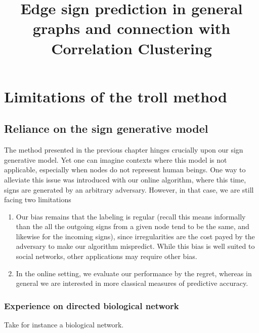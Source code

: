 \documentclass[nobib, a4paper, 10pt, oneside, onecolumn, openany, notitlepage, final,
svgnames, marginals=raggedouter, english,
]{article}
\title{Edge sign prediction in general graphs and connection with Correlation Clustering}
\begin{document}
\maketitle

\section{Limitations of the troll method}
\label{sec:limitations_of_the_troll_method}

\subsection{Reliance on the sign generative model}
\label{sub:reliance_on_the_sign_generative_model}

The method presented in the previous chapter hinges crucially upon our sign generative model. Yet
one can imagine contexts where this model is not applicable, especially when nodes do not represent
human beings. One way to alleviate this issue was introduced with our online algorithm, where this
time, signs are generated by an arbitrary adversary. However, in that case, we are still facing two
limitations
\begin{enumerate}
	\item Our bias remains that the labeling is regular (recall this means informally than the all
		the outgoing signs from a given node tend to be the same, and likewise for the incoming signs),
		since irregularities are the cost payed by the adversary to make our algorithm mispredict. While
		this bias is well suited to social networks, other applications may require other
		bias.
	\item In the online setting, we evaluate our performance by the regret,
		whereas in general we are interested in more classical measures of predictive accuracy.
\end{enumerate}

\subsubsection{Experience on directed biological network}
\label{ssub:experience_on_directed_biological_network}

Take for instance a biological network.
\end{document}
